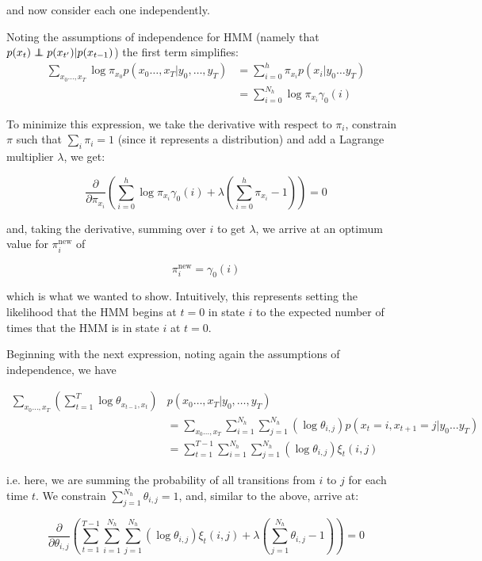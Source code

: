\documentclass{article}
\newcommand\independent{\protect\mathpalette{\protect\independenT}{\perp}}
\def\independenT#1#2{\mathrel{\rlap{$#1#2$}\mkern2mu{#1#2}}}
\begin{document}
\begin{enumerate}[(a)]
and now consider each one independently.

Noting the assumptions of independence for HMM (namely that $p(x_{t})
\independent  p(x_{t'}) | p(x_{t-1})$) the first term simplifies:
\begin{align*}
 \sum \limits_{x_0\dots,x_T} \log\pi_{x_0}p(x_0\dots,x_T | y_0,\dots,y_T) &=  \sum_{i=0}^h \pi_{x_i} p(x_i | y_0\dots y_T)\\
&= \sum_{i=0}^{N_h} \log\pi_{x_i}\gamma_0(i)
\end{align*}

To minimize this expression, we take the derivative with respect to
$\pi_i$, constrain $\pi$ such that $\sum_i\pi_i = 1$ (since it represents a
distribution) and add a Lagrange multiplier $\lambda$, we get:

\begin{equation*}
\frac \partial {\partial\pi_{x_i}} \left(\sum_{i=0}^h \log\pi_{x_i}\gamma_0(i) +
  \lambda(\sum_{i=0}^h\pi_{x_i} - 1) \right)  = 0
\end{equation*}

and, taking the derivative, summing over $i$ to get $\lambda$, we arrive at
an optimum value for $\pi^{\text{new}}_i$ of

\begin{equation*}
\pi^{\text{new}}_i = \gamma_0(i)
\end{equation*}

which is what we wanted to show. Intuitively, this represents setting
the likelihood that the HMM begins at $t = 0$ in state $i$ to the
expected number of times that the HMM is in state $i$ at $t = 0$.

Beginning with the next expression, noting again the assumptions of
independence, we have

\begin{align*}
\sum_{x_0\dots,x_T}  (\sum_{t=1}^T \log\theta_{x_{t-1}, x_t})&p(x_0\dots,x_T | y_0,\dots,y_T)\\
&= \sum_{x_0\dots,x_T} \sum_{i=1}^{N_h} \sum_{j=1}^{N_h} (\log\theta_{i, j})p(x_t = i, x_{t+1} = j | y_0 \dots y_T) \\
 &=\sum_{t=1}^{T-1} \sum_{i=1}^{N_h} \sum_{j=1}^{N_h} (\log\theta_{i, j})\xi_t(i, j)
\end{align*}

i.e. here, we are summing the probability of all transitions from $i$
to $j$ for each time $t$. We constrain $\sum_{j=1}^{N_h}\theta_{i, j} = 1$,
and, similar to the above, arrive at:

\begin{equation*}
\frac \partial {\partial\theta_{i, j}} \left( \sum_{t=1}^{T-1} \sum_{i=1}^{N_h} \sum_{j=1}^{N_h} (\log\theta_{i, j})\xi_t(i, j) + \lambda(\sum_{j=1}^{N_h}\theta_{i, j} -  1) \right) = 0
\end{equation*}


\end{enumerate}
\end{document}
